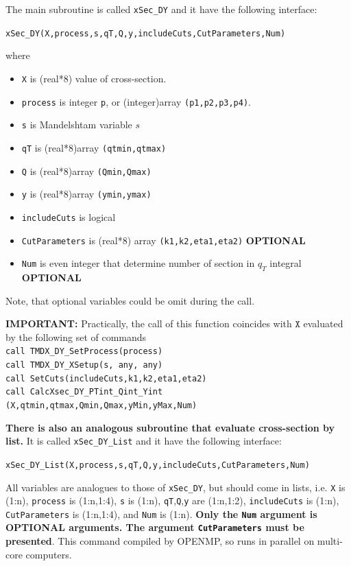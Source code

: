 \documentclass[prd,nofootinbib,eqsecnum,final]{revtex4}
\renewcommand{\(}{\left(}
\renewcommand{\)}{\right)}
\renewcommand{\[}{\left[}
\renewcommand{\]}{\right]}
\newcommand{\red}[1]{{\color[rgb]{1,0,0} #1}}
\newcommand{\blue}[1]{{\color{blue} #1}}
\begin{document}
\begin{tcolorbox}
The main subroutine is called \texttt{xSec\_DY} and it have the following interface:

\begin{center}
\texttt{xSec\_DY(X,process,s,qT,Q,y,includeCuts,CutParameters,Num)}
\end{center}

where
\begin{itemize}
\item \texttt{X} is (real*8) value of cross-section.
\item \texttt{process} is integer \texttt{p}, or (integer)array \texttt{(p1,p2,p3,p4)}.
\item \texttt{s} is Mandelshtam variable $s$
\item \texttt{qT} is (real*8)array \texttt{(qtmin,qtmax)}
\item \texttt{Q} is (real*8)array \texttt{(Qmin,Qmax)}
\item \texttt{y} is (real*8)array \texttt{(ymin,ymax)}
\item \texttt{includeCuts} is logical
\item \texttt{CutParameters} is (real*8) array \texttt{(k1,k2,eta1,eta2)} \textbf{OPTIONAL}
\item \texttt{Num} is even integer that determine number of section in $q_T$ integral \textbf{OPTIONAL}
\end{itemize}
Note, that optional variables could be omit during the call. 
\end{tcolorbox}
\textbf{IMPORTANT: } Practically, the call of this function coincides with $\texttt{X}$ evaluated by the following set of commands
\\
\texttt{call TMDX\_DY{\_}SetProcess(process)}
\\
\texttt{call TMDX\_DY{\_}XSetup(s,\red{any},\red{any})}
\\
\texttt{call SetCuts(includeCuts,k1,k2,eta1,eta2)}
\\
\texttt{call CalcXsec\_DY{\_}PTint{\_}Qint{\_}Yint} \texttt{(X,qtmin,qtmax,Qmin,Qmax,yMin,yMax,Num)}

\begin{tcolorbox}
\textbf{\blue{There is also an analogous subroutine that evaluate cross-section by list.}} It is called \texttt{xSec\_DY\_List} and it have the following interface:

\begin{center}
\texttt{xSec\_DY\_List(X,process,s,qT,Q,y,includeCuts,CutParameters,Num)}
\end{center}
All variables are analogues to those of \texttt{xSec\_DY}, but should come in lists, i.e. \texttt{X} is (1:n), \texttt{process} is (1:n,1:4), \texttt{s} is (1:n), \texttt{qT},\texttt{Q},\texttt{y} are (1:n,1:2), \texttt{includeCuts} is (1:n), \texttt{CutParameters} is (1:n,1:4), and \texttt{Num} is (1:n). \textbf{Only the \texttt{Num} argument is OPTIONAL arguments. The argument \texttt{CutParameters} must be presented}. This command compiled by OPENMP, so runs in parallel on multi-core computers.
\end{tcolorbox}
\end{document}
